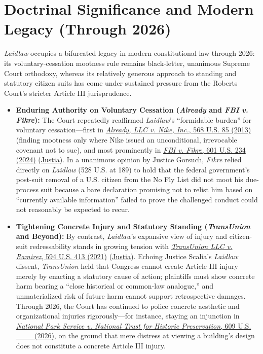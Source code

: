 \documentclass[12pt]{article}
\begin{document}
\section{Doctrinal Significance and Modern Legacy (Through 2026)}
\textit{Laidlaw} occupies a bifurcated legacy in modern constitutional law through 2026: its voluntary-cessation mootness rule remains black-letter, unanimous Supreme Court orthodoxy, whereas its relatively generous approach to standing and statutory citizen suits has come under sustained pressure from the Roberts Court's stricter Article III jurisprudence.
\begin{itemize}
  \item \textbf{Enduring Authority on Voluntary Cessation (\textit{Already} and \textit{FBI v. Fikre}):} The Court repeatedly reaffirmed \textit{Laidlaw}'s ``formidable burden'' for voluntary cessation---first in \href{https://www.law.cornell.edu/supremecourt/text/11-982}{\textit{Already, LLC v. Nike, Inc.}, 568 U.S. 85 (2013)} (finding mootness only where Nike issued an unconditional, irrevocable covenant not to sue), and most prominently in \href{https://www.supremecourt.gov/opinions/23pdf/601us1r11_7lh8.pdf}{\textit{FBI v. Fikre}, 601 U.S. 234 (2024)} (\href{https://supreme.justia.com/cases/federal/us/601/22-1178/}{Justia}). In a unanimous opinion by Justice Gorsuch, \textit{Fikre} relied directly on \textit{Laidlaw} (528 U.S. at 189) to hold that the federal government's post-suit removal of a U.S. citizen from the No Fly List did not moot his due-process suit because a bare declaration promising not to relist him based on ``currently available information'' failed to prove the challenged conduct could not reasonably be expected to recur.
  \item \textbf{Tightening Concrete Injury and Statutory Standing (\textit{TransUnion} and Beyond):} By contrast, \textit{Laidlaw}'s expansive view of injury and citizen-suit redressability stands in growing tension with \href{https://www.law.cornell.edu/supremecourt/text/20-297}{\textit{TransUnion LLC v. Ramirez}, 594 U.S. 413 (2021)} (\href{https://supreme.justia.com/cases/federal/us/594/20-297/}{Justia}). Echoing Justice Scalia's \textit{Laidlaw} dissent, \textit{TransUnion} held that Congress cannot create Article III injury merely by enacting a statutory cause of action; plaintiffs must show concrete harm bearing a ``close historical or common-law analogue,'' and unmaterialized risk of future harm cannot support retrospective damages. Through 2026, the Court has continued to police concrete aesthetic and organizational injuries rigorously---for instance, staying an injunction in \href{https://supreme.justia.com/cases/federal/us/609/26a203/}{\textit{National Park Service v. National Trust for Historic Preservation}, 609 U.S. \_\_\_ (2026)}, on the ground that mere distress at viewing a building's design does not constitute a concrete Article III injury.
\end{itemize}
\end{document}
